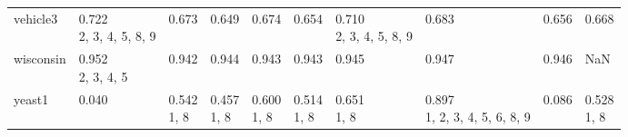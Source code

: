 \begin{tabular}{llllllllll}
vehicle3               &        \makecell{0.722 \\ \scriptsize{2, 3, 4, 5, 8, 9}} &         \makecell{0.673 \\ \scriptsize{}} &                  \makecell{0.649 \\ \scriptsize{}} &                  \makecell{0.674 \\ \scriptsize{}} &               \makecell{0.654 \\ \scriptsize{}} &     \makecell{0.710 \\ \scriptsize{2, 3, 4, 5, 8, 9}} &                        \makecell{0.683 \\ \scriptsize{}} &      \makecell{0.656 \\ \scriptsize{}} &         \makecell{0.668 \\ \scriptsize{}} \\
wisconsin              &              \makecell{0.952 \\ \scriptsize{2, 3, 4, 5}} &         \makecell{0.942 \\ \scriptsize{}} &                  \makecell{0.944 \\ \scriptsize{}} &                  \makecell{0.943 \\ \scriptsize{}} &               \makecell{0.943 \\ \scriptsize{}} &                     \makecell{0.945 \\ \scriptsize{}} &                        \makecell{0.947 \\ \scriptsize{}} &      \makecell{0.946 \\ \scriptsize{}} &                                       NaN \\
yeast1                 &                        \makecell{0.040 \\ \scriptsize{}} &     \makecell{0.542 \\ \scriptsize{1, 8}} &              \makecell{0.457 \\ \scriptsize{1, 8}} &              \makecell{0.600 \\ \scriptsize{1, 8}} &           \makecell{0.514 \\ \scriptsize{1, 8}} &                 \makecell{0.651 \\ \scriptsize{1, 8}} &  \makecell{0.897 \\ \scriptsize{1, 2, 3, 4, 5, 6, 8, 9}} &      \makecell{0.086 \\ \scriptsize{}} &     \makecell{0.528 \\ \scriptsize{1, 8}} \\

\end{tabular}
